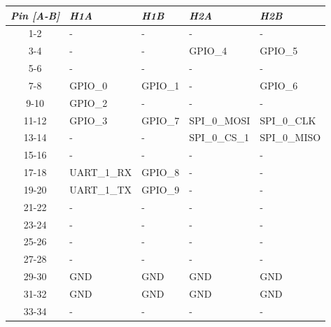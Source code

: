 \begin{table}[!h]
    \centering
    \begin{tabular}{cllll}
        \toprule[1.5pt]
        \textit{Pin [A-B]} & \textit{H1A}     & \textit{H1B}     & \textit{H2A}  & \textit{H2B}  \\
        \midrule
        1-2                & -                & -                & -             & -             \\
        3-4                & -                & -                & GPIO\_4       & GPIO\_5       \\
        5-6                & -                & -                & -             & -             \\
        7-8                & GPIO\_0          & GPIO\_1          & -             & GPIO\_6       \\
        9-10               & GPIO\_2          & -                & -             & -             \\
        11-12              & GPIO\_3          & GPIO\_7          & SPI\_0\_MOSI  & SPI\_0\_CLK   \\
        13-14              & -                & -                & SPI\_0\_CS\_1 & SPI\_0\_MISO  \\
        15-16              & -                & -                & -             & -             \\
        17-18              & UART\_1\_RX      & GPIO\_8          & -             & -             \\
        19-20              & UART\_1\_TX      & GPIO\_9          & -             & -             \\
        21-22              & -                & -                & -             & -             \\
        23-24              & -                & -                & -             & -             \\
        25-26              & -                & -                & -             & -             \\
        27-28              & -                & -                & -             & -             \\
        29-30              & GND              & GND              & GND           & GND           \\
        31-32              & GND              & GND              & GND           & GND           \\
        33-34              & -                & -                & -             & -             \\

\end{tabular}
\end{table}
